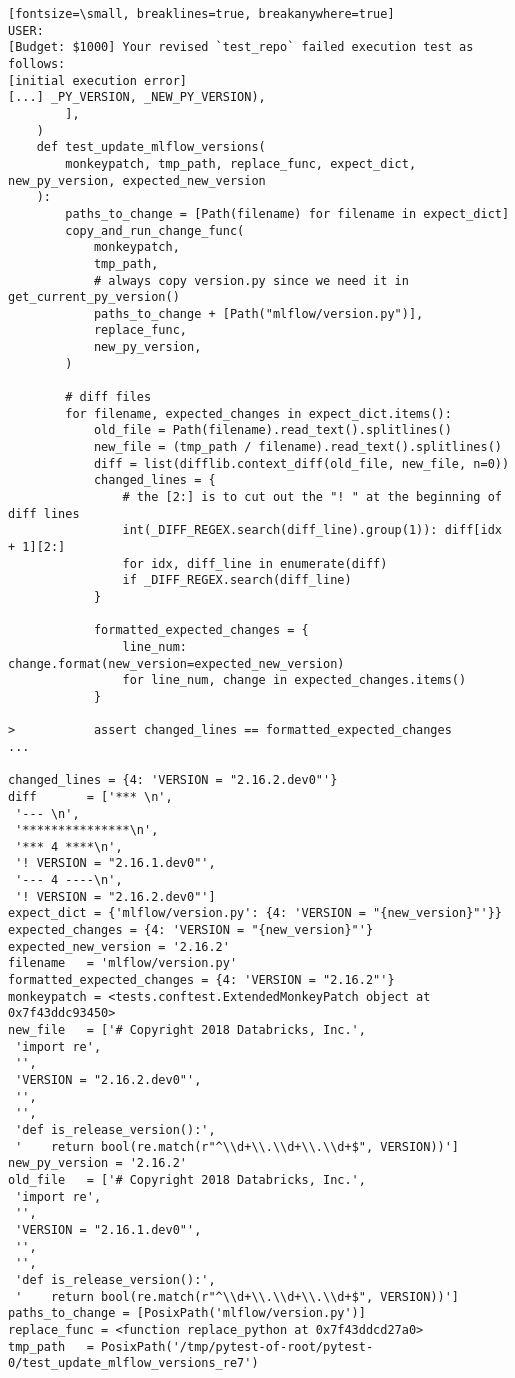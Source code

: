 \begin{verbatim}[fontsize=\small, breaklines=true, breakanywhere=true]
USER:
[Budget: $1000] Your revised `test_repo` failed execution test as follows:
[initial execution error]
[...] _PY_VERSION, _NEW_PY_VERSION),
        ],
    )
    def test_update_mlflow_versions(
        monkeypatch, tmp_path, replace_func, expect_dict, new_py_version, expected_new_version
    ):
        paths_to_change = [Path(filename) for filename in expect_dict]
        copy_and_run_change_func(
            monkeypatch,
            tmp_path,
            # always copy version.py since we need it in get_current_py_version()
            paths_to_change + [Path("mlflow/version.py")],
            replace_func,
            new_py_version,
        )
    
        # diff files
        for filename, expected_changes in expect_dict.items():
            old_file = Path(filename).read_text().splitlines()
            new_file = (tmp_path / filename).read_text().splitlines()
            diff = list(difflib.context_diff(old_file, new_file, n=0))
            changed_lines = {
                # the [2:] is to cut out the "! " at the beginning of diff lines
                int(_DIFF_REGEX.search(diff_line).group(1)): diff[idx + 1][2:]
                for idx, diff_line in enumerate(diff)
                if _DIFF_REGEX.search(diff_line)
            }
    
            formatted_expected_changes = {
                line_num: change.format(new_version=expected_new_version)
                for line_num, change in expected_changes.items()
            }
    
>           assert changed_lines == formatted_expected_changes
...

changed_lines = {4: 'VERSION = "2.16.2.dev0"'}
diff       = ['*** \n',
 '--- \n',
 '***************\n',
 '*** 4 ****\n',
 '! VERSION = "2.16.1.dev0"',
 '--- 4 ----\n',
 '! VERSION = "2.16.2.dev0"']
expect_dict = {'mlflow/version.py': {4: 'VERSION = "{new_version}"'}}
expected_changes = {4: 'VERSION = "{new_version}"'}
expected_new_version = '2.16.2'
filename   = 'mlflow/version.py'
formatted_expected_changes = {4: 'VERSION = "2.16.2"'}
monkeypatch = <tests.conftest.ExtendedMonkeyPatch object at 0x7f43ddc93450>
new_file   = ['# Copyright 2018 Databricks, Inc.',
 'import re',
 '',
 'VERSION = "2.16.2.dev0"',
 '',
 '',
 'def is_release_version():',
 '    return bool(re.match(r"^\\d+\\.\\d+\\.\\d+$", VERSION))']
new_py_version = '2.16.2'
old_file   = ['# Copyright 2018 Databricks, Inc.',
 'import re',
 '',
 'VERSION = "2.16.1.dev0"',
 '',
 '',
 'def is_release_version():',
 '    return bool(re.match(r"^\\d+\\.\\d+\\.\\d+$", VERSION))']
paths_to_change = [PosixPath('mlflow/version.py')]
replace_func = <function replace_python at 0x7f43ddcd27a0>
tmp_path   = PosixPath('/tmp/pytest-of-root/pytest-0/test_update_mlflow_versions_re7')


\end{verbatim}
